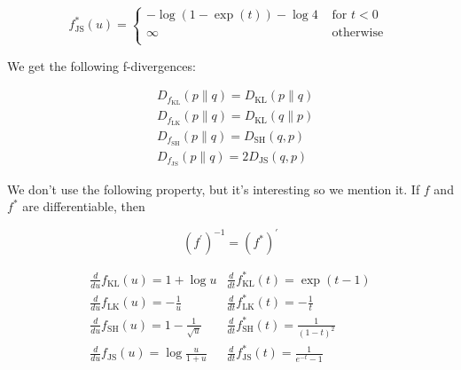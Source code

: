 \begin{example}
\begin{itemize}
        $$
        f_{\mathrm{JS}}^{*}(u)=
        \begin{cases}
        -\log (1-\exp (t))-\log 4 & \text { for } t < 0 \\
        \infty & \text { otherwise } \\
        \end{cases}
        $$
    \end{itemize}

    We get the following f-divergences:

    $$
    \begin{aligned}
    & D_{f_{\mathrm{KL}}}(p \| q)=D_{\mathrm{KL}}(p \| q) \\
    & D_{f_{\mathrm{LK}}}(p \| q)=D_{\mathrm{KL}}(q \| p) \\
    & D_{f_{\mathrm{SH}}}(p \| q)=D_{\mathrm{SH}}(q, p) \\
    & D_{f_{\mathrm{JS}}}(p \| q)=2 D_{\mathrm{JS}}(q, p)
    \end{aligned}
    $$

    We don't use the following property, but it's interesting so we mention it. If $f$ and $f^{*}$ are differentiable, then

    $$
    \left(f^{\prime}\right)^{-1}=\left(f^{*}\right)^{\prime}
    $$

    $$
    \begin{array}{ll}
    \frac{d}{d u} f_{\mathrm{KL}}(u)=1+\log u & \frac{d}{d t} f_{\mathrm{KL}}^{*}(t)=\exp (t-1) \\
    \frac{d}{d u} f_{\mathrm{LK}}(u)=-\frac{1}{u} & \frac{d}{d t} f_{\mathrm{LK}}^{*}(t)=-\frac{1}{t} \\
    \frac{d}{d u} f_{\mathrm{SH}}(u)=1-\frac{1}{\sqrt{u}} & \frac{d}{d t} f_{\mathrm{SH}}^{*}(t)=\frac{1}{(1-t)^{2}} \\
    \frac{d}{d u} f_{\mathrm{JS}}(u)=\log \frac{u}{1+u} & \frac{d}{d t} f_{\mathrm{JS}}^{*}(t)=\frac{1}{e^{-t}-1}
    \end{array}
    $$
\end{example}

